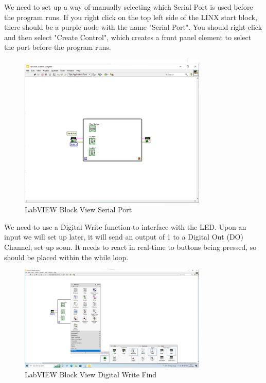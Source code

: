 \documentclass[a4paper,11pt]{report}
\begin{document}
We need to set up a way of manually selecting which Serial Port is used before the program runs. If you right click on the top left side of the LINX start block, there should be a purple node with the name "Serial Port". You should right click and then select "Create Control", which creates a front panel element to select the port before the program runs.

\begin{figure}[H]
\centering
\includegraphics[width=0.8\textwidth]{screenshots/labview18}
\caption{LabVIEW Block View Serial Port}
\end{figure}

We need to use a Digital Write function to interface with the LED. Upon an input we will set up later, it will send an output of 1 to a Digital Out (DO) Channel, set up soon. It needs to react in real-time to buttons being pressed, so should be placed within the while loop.

\begin{figure}[H]
\centering
\includegraphics[width=0.8\textwidth]{screenshots/labview17}
\caption{LabVIEW Block View Digital Write Find}
\end{figure}
\end{document}
